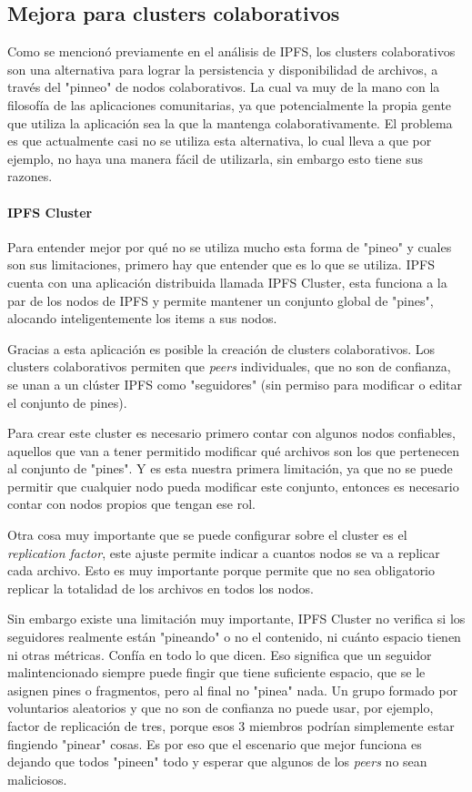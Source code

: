 \subsection{Mejora para clusters colaborativos}

Como se mencionó previamente en el análisis de IPFS, los clusters colaborativos son una alternativa para lograr la persistencia y disponibilidad de archivos, a través del "pinneo" de nodos colaborativos. La cual va muy de la mano con la filosofía de las aplicaciones comunitarias, ya que potencialmente la propia gente que utiliza la aplicación sea la que la mantenga colaborativamente. El problema es que actualmente casi no se utiliza esta alternativa, lo cual lleva a que por ejemplo, no haya una manera fácil de utilizarla, sin embargo esto tiene sus razones.

\paragraph{IPFS Cluster}

Para entender mejor por qué no se utiliza mucho esta forma de "pineo" y cuales son sus limitaciones, primero hay que entender que es lo que se utiliza. IPFS cuenta con una aplicación distribuida llamada IPFS Cluster, esta funciona a la par de los nodos de IPFS y permite mantener un conjunto global de "pines", alocando inteligentemente los items a sus nodos.

Gracias a esta aplicación es posible la creación de clusters colaborativos. Los clusters colaborativos permiten que \textit{peers} individuales, que no son de confianza, se unan a un clúster IPFS como "seguidores" (sin permiso para modificar o editar el conjunto de pines).

Para crear este cluster es necesario primero contar con algunos nodos confiables, aquellos que van a tener permitido modificar qué archivos son los que pertenecen al conjunto de "pines". Y es esta nuestra primera limitación, ya que no se puede permitir que cualquier nodo pueda modificar este conjunto, entonces es necesario contar con nodos propios que tengan ese rol.

Otra cosa muy importante que se puede configurar sobre el cluster es el \textit{replication factor}, este ajuste permite indicar a cuantos nodos se va a replicar cada archivo. Esto es muy importante porque permite que no sea obligatorio replicar la totalidad de los archivos en todos los nodos. 

Sin embargo existe una limitación muy importante, IPFS Cluster no verifica si los seguidores realmente están "pineando" o no el contenido, ni cuánto espacio tienen ni otras métricas. Confía en todo lo que dicen. Eso significa que un seguidor malintencionado siempre puede fingir que tiene suficiente espacio, que se le asignen pines o fragmentos, pero al final no "pinea" nada. Un grupo formado por voluntarios aleatorios y que no son de confianza no puede usar, por ejemplo, factor de replicación de tres, porque esos 3 miembros podrían simplemente estar fingiendo "pinear" cosas. Es por eso que el escenario que mejor funciona es dejando que todos "pineen" todo y esperar que algunos de los \textit{peers} no sean maliciosos.

